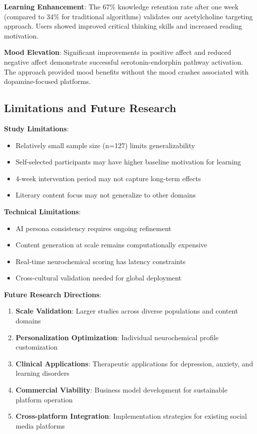 \documentclass[11pt,letterpaper]{article}
\begin{document}
\textbf{Learning Enhancement}: The 67\% knowledge retention rate after one week (compared to 34\% for traditional algorithms) validates our acetylcholine targeting approach. Users showed improved critical thinking skills and increased reading motivation.

\textbf{Mood Elevation}: Significant improvements in positive affect and reduced negative affect demonstrate successful serotonin-endorphin pathway activation. The approach provided mood benefits without the mood crashes associated with dopamine-focused platforms.

\subsection{Limitations and Future Research}

\textbf{Study Limitations}:
\begin{itemize}
    \item Relatively small sample size (n=127) limits generalizability
    \item Self-selected participants may have higher baseline motivation for learning
    \item 4-week intervention period may not capture long-term effects
    \item Literary content focus may not generalize to other domains
\end{itemize}

\textbf{Technical Limitations}:
\begin{itemize}
    \item AI persona consistency requires ongoing refinement
    \item Content generation at scale remains computationally expensive
    \item Real-time neurochemical scoring has latency constraints
    \item Cross-cultural validation needed for global deployment
\end{itemize}

\textbf{Future Research Directions}:
\begin{enumerate}
    \item \textbf{Scale Validation}: Larger studies across diverse populations and content domains
    \item \textbf{Personalization Optimization}: Individual neurochemical profile customization
    \item \textbf{Clinical Applications}: Therapeutic applications for depression, anxiety, and learning disorders
    \item \textbf{Commercial Viability}: Business model development for sustainable platform operation
    \item \textbf{Cross-platform Integration}: Implementation strategies for existing social media platforms
\end{enumerate}
\end{document}
